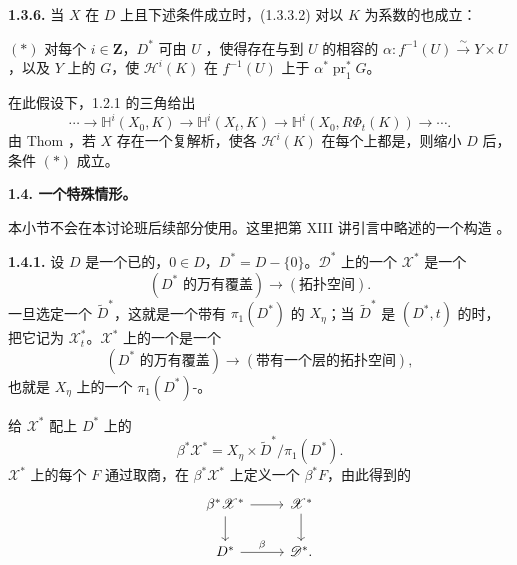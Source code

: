 \textbf{1.3.6.} 当 $X$ 在 $D$ 上且下述条件成立时，(1.3.3.2) 对以 $K$ 为系数的也成立：

$(*)$ 对每个 $i\in\mathbf Z$，$D^*$ 可由 $U$ ，使得存在与到 $U$ 的相容的 $\alpha:f^{-1}(U)\xrightarrow{\sim}Y\times U$，以及 $Y$ 上的 $G$，使 $\mathcal H^i(K)$ 在 $f^{-1}(U)$ 上于 $\alpha^*\operatorname{pr}_1^*G$。

在此假设下，1.2.1 的三角给出
\[
 \cdots\longrightarrow\mathbb H^i(X_0,K)
 \longrightarrow\mathbb H^i(X_t,K)
 \longrightarrow\mathbb H^i(X_0,R\Phi_t(K))
 \longrightarrow\cdots.\tag{1.3.6.1}
\]
由 Thom ，若 $X$ 存在一个复解析，使各 $\mathcal H^i(K)$ 在每个上都是，则缩小 $D$ 后，条件 $(*)$ 成立。

\textbf{1.4. 一个特殊情形。}

本小节不会在本讨论班后续部分使用。这里把第 XIII 讲引言中略述的一个构造
。

\textbf{1.4.1.} 设 $D$ 是一个已的，$0\in D$，$D^*=D-\{0\}$。$\mathscr D^*$ 上的一个 $\mathscr X^*$ 是一个
\[
 (D^*\text{ 的万有覆盖})\longrightarrow(\text{拓扑空间}).
\]
一旦选定一个 $\widetilde D^*$，这就是一个带有 $\pi_1(D^*)$ 的 $X_\eta$；当 $\widetilde D^*$ 是 $(D^*,t)$ 的时，把它记为 $\mathscr X_t^*$。$\mathscr X^*$ 上的一个是一个
\[
 (D^*\text{ 的万有覆盖})\longrightarrow(\text{带有一个层的拓扑空间}),
\]
也就是 $X_\eta$ 上的一个 $\pi_1(D^*)$-。

给 $\mathscr X^*$ 配上 $D^*$ 上的
\[
 \beta^*\mathscr X^*=X_\eta\times\widetilde D^*/\pi_1(D^*).
\]
$\mathscr X^*$ 上的每个 $F$ 通过取商，在 $\beta^*\mathscr X^*$ 上定义一个 $\beta^*F$，由此得到的
\[
\begin{tikzcd}
\beta^*\mathscr X^*\arrow[r]\arrow[d]&\mathscr X^*\arrow[d]\\
D^*\arrow[r,"\beta"]&\mathscr D^*.
\end{tikzcd}
\]

